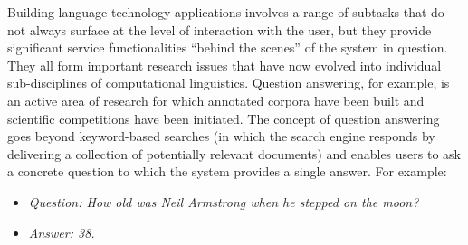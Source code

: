 \begin{multicols}{2}
Building language technology applications involves a range of subtasks that do not always surface at the level of interaction with the user, but they provide significant service functionalities “behind the scenes” of the system in question. They all form important research issues that have now evolved into individual sub-disciplines of computational linguistics. Question answering, for example, is an active area of research for which annotated corpora have been built and scientific competitions have been initiated. The concept of question answering goes beyond keyword-based searches (in which the search engine responds by delivering a collection of potentially relevant documents) and enables users to ask a concrete question to which the system provides a single answer. For example:

\begin{itemize}
\item[] \textit{Question: How old was Neil Armstrong when he stepped on the moon?}
\item[] \textit{Answer: 38.}
\end{itemize}


\end{multicols}
